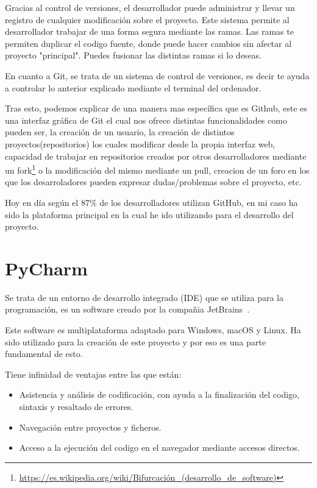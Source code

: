 \documentclass[a4paper, 12pt]{book}
\begin{document}
Gracias al control de versiones, el desarrollador puede administrar y llevar un registro de cualquier modificación sobre el proyecto. Este sistema permite al desarrollador trabajar de una forma segura mediante las ramas. Las ramas te permiten duplicar el codigo fuente, donde puede hacer cambios sin afectar al proyecto "principal". Puedes fusionar las distintas ramas si lo deseas.

En cuanto a Git, se trata de un sistema de control de versiones, es decir te ayuda a controlar lo anterior explicado mediante el terminal del ordenador.

Tras esto, podemos explicar de una manera mas específica que es Github, este es una interfaz gráfica de Git el cual nos ofrece distintas funcionalidades como pueden ser, la creación de un usuario, la creación de distintos proyectos(repositorios) los cuales modificar desde la propia interfaz web, capacidad de trabajar en repositorios creados por otros desarrolladores mediante un fork\footnote{\url{https://es.wikipedia.org/wiki/Bifurcación_(desarrollo_de_software)}} o la modificación del mismo mediante un pull, creacion de un foro en los que los desarroladores pueden expresar dudas/problemas sobre el proyecto, etc.

Hoy en día según el 87\% de los desarrolladores utilizan GitHub, en mi caso ha sido la plataforma principal en la cual he ido utilizando para el desarrollo del proyecto.


\section{PyCharm} %
\label{sec:GitHub}
Se trata de un entorno de desarrollo integrado (IDE) que se utiliza para la programación, es un software creado por la compañia JetBrains~\cite{jetbrains}.

Este software es multiplataforma adaptado para Windows, macOS y Linux. Ha sido utilizado para la creación de este proyecto y por eso es una parte fundamental de esto.

Tiene infinidad de ventajas entre las que están:

\begin{itemize}
    \item Asistencia y análisis de codificación, con ayuda a la finalización del codigo, sintaxis y resaltado de errores.
    \item Navegación entre proyectos y ficheros.
    \item Acceso a la ejecución del codigo en el navegador mediante accesos directos.
\end{itemize}
\end{document}
